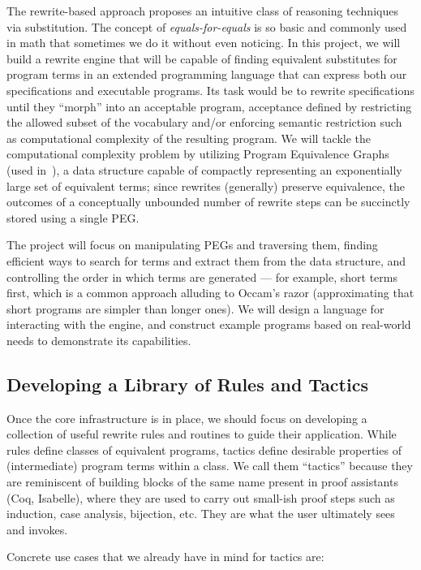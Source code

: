 The rewrite-based approach proposes an intuitive class of reasoning techniques
via substitution.
The concept of \emph{equals-for-equals} is so basic and commonly used in math
that sometimes we do it without even noticing.
In this project, we will build a rewrite engine that will be
capable of finding equivalent substitutes for program terms in an extended programming language that
can express both our specifications and executable programs.
Its task would be to rewrite specifications until they ``morph'' into an
acceptable program, acceptance defined by restricting the allowed subset of the
vocabulary and/or enforcing semantic restriction such as computational complexity
of the resulting program.
We will tackle the computational complexity problem by utilizing Program
Equivalence Graphs (used \eg in~\cite{PLDI2015/Wilcox}),
a data structure capable of compactly representing an exponentially large
set of equivalent terms;
since rewrites (generally) preserve equivalence,
the outcomes of a conceptually unbounded number of rewrite steps
can be succinctly stored using a single PEG.

The project will focus on manipulating PEGs and traversing them, finding
efficient ways to search for terms and extract them from the data structure,
and controlling the order in which terms are generated --- for example,
short terms first, which is a common approach alluding to Occam's razor
(approximating that short programs are simpler than longer ones).
We will design a language for interacting with the engine, and construct 
example programs based on real-world needs to demonstrate its capabilities.


\subsection{Developing a Library of Rules and Tactics}

Once the core infrastructure is in place, we should focus on developing
a collection of useful rewrite rules and routines to guide their application.
While rules define classes of equivalent programs, tactics define desirable
properties of (intermediate) program terms within a class.
We call them ``tactics'' because they are reminiscent of building
blocks of the same name present in proof
assistants (Coq, Isabelle), where they are used to carry out
small-ish proof steps such as induction, case analysis, bijection, etc.
They are what the user ultimately sees and invokes.

Concrete use cases that we already have in mind for tactics are:

